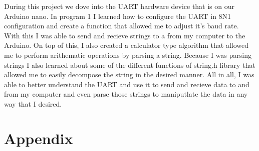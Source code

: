 \documentclass[11pt,pdftex,portrait,letterpaper]{article}
\begin{document}
	During this project we dove into the UART hardware device that is on our Arduino nano. In program 1 I learned how to configure the UART in 8N1 configuration and create a function that allowed me to adjust it's baud rate. With this I was able to send and recieve strings to a from my computer to the Arduino. On top of this, I also created a calculator type algorithm that allowed me to perform arithematic operations by parsing a string. Because I was parsing strings I also learned about some of the different functions of string.h library that allowed me to easily decompose the string in the desired manner. All in all, I was able to better understand the UART and use it to send and recieve data to and from my computer and even parse those strings to maniputlate the data in any way that I desired.
	
	
	
	
	\pagebreak
	
	
	\section{Appendix}
	
\end{document}
